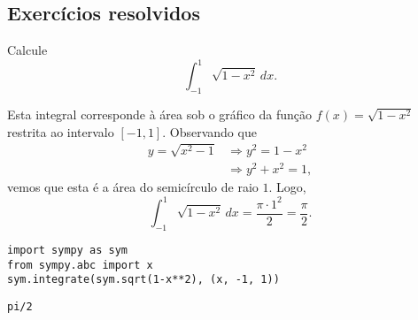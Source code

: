 \subsection{Exercícios resolvidos}

\begin{exeresol}
  Calcule
  \begin{equation}
    \int_{-1}^1 \sqrt{1 - x^2}\,dx.
  \end{equation}
\end{exeresol}
\begin{resol}
  Esta integral corresponde à área sob o gráfico da função $f(x) = \sqrt{1 - x^2}$ restrita ao intervalo $[-1, 1]$. Observando que
  \begin{align}
    y = \sqrt{x^2 - 1} &\Rightarrow y^2 = 1 - x^2\\
                       &\Rightarrow y^2 + x^2 = 1,
  \end{align}
  vemos que esta é a área do semicírculo de raio $1$. Logo,
  \begin{equation}
    \int_{-1}^1 \sqrt{1 - x^2}\,dx = \frac{\pi \cdot 1^2}{2} = \frac{\pi}{2}.
  \end{equation}

\begin{lstlisting}
import sympy as sym
from sympy.abc import x
sym.integrate(sym.sqrt(1-x**2), (x, -1, 1))
\end{lstlisting}

\begin{verbatim}
pi/2
\end{verbatim}

\end{resol}

